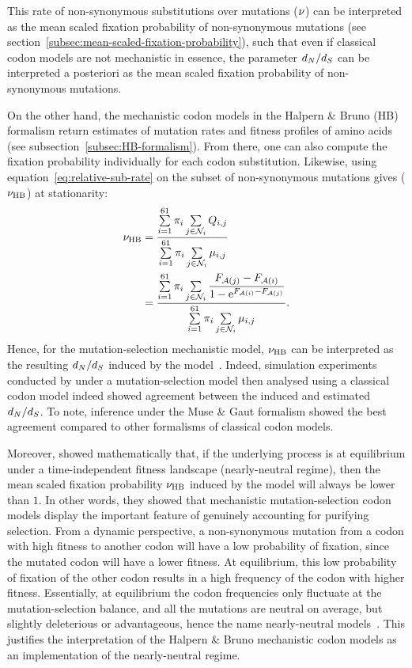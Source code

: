This rate of non-synonymous substitutions over mutations ($\nu$) can be interpreted as the mean scaled fixation probability of non-synonymous mutations (see section~\ref{subsec:mean-scaled-fixation-probability}), such that even if classical codon models are not mechanistic in essence, the parameter $d_N / d_S$ can be interpreted a posteriori as the mean scaled fixation probability of non-synonymous mutations.

On the other hand, the mechanistic codon models in the Halpern \& Bruno (\acrshort{HB}) formalism return estimates of mutation rates and fitness profiles of amino acids (see subsection~\ref{subsec:HB-formalism}).
From there, one can also compute the fixation probability individually for each codon substitution.
Likewise, using equation~\ref{eq:relative-sub-rate} on the subset of non-synonymous mutations gives ($\nu_{\text{HB}}$) at stationarity:
\begin{align}
    \nu_{\text{HB}} & = \dfrac{ \sum\limits_{{i}=1}^{61} \pi_{{i}} \sum\limits_{{j} \in \mathcal{N}_{{i}}} Q_{{i}, {j}}}{\sum\limits_{{i}=1}^{61} \pi_{{i}} \sum\limits_{{j} \in \mathcal{N}_{{i}}} \mu_{{i}, {j}}} \\
    & = \dfrac{ \sum\limits_{{i}=1}^{61} \pi_{{i}} \sum\limits_{{j} \in \mathcal{N}_{{i}}} \dfrac{F_{\mathcal{A}({j})} - F_{\mathcal{A}({i})}}{1 - \text{e}^{F_{\mathcal{A}({i})} - F_{\mathcal{A}({j})}} }}{\sum\limits_{{i}=1}^{61} \pi_{{i}} \sum\limits_{{j} \in \mathcal{N}_{{i}} } \mu_{{i}, {j}}}.
\end{align}
Hence, for the mutation-selection mechanistic model, $\nu_{\text{HB}}$ can be interpreted as the resulting $d_N / d_S$ induced by the model~\citep{Spielman2015,DosReis2015}.
Indeed, simulation experiments conducted by \citet{Spielman2015} under a mutation-selection model then analysed using a classical codon model indeed showed agreement between the induced and estimated $d_N / d_S$.
To note, inference under the Muse \& Gaut formalism showed the best agreement compared to other formalisms of classical codon models.

Moreover, \citet{Spielman2015} showed mathematically that, if the underlying process is at equilibrium under a time-independent fitness landscape (nearly-neutral regime), then the mean scaled fixation probability $\nu_{\text{HB}}$ induced by the model will always be lower than $1$.
In other words, they showed that mechanistic mutation-selection codon models display the important feature of genuinely accounting for purifying selection.
From a dynamic perspective, a non-synonymous mutation from a codon with high fitness to another codon will have a low probability of fixation, since the mutated codon will have a lower fitness.
At equilibrium, this low probability of fixation of the other codon results in a high frequency of the codon with higher fitness.
Essentially, at equilibrium the codon frequencies only fluctuate at the mutation-selection balance, and all the mutations are neutral on average, but slightly deleterious or advantageous, hence the name nearly-neutral models~\citep{Ohta1973, Ohta1992, Rodrigue2016}.
This justifies the interpretation of the Halpern \& Bruno mechanistic codon models as an implementation of the nearly-neutral regime.

